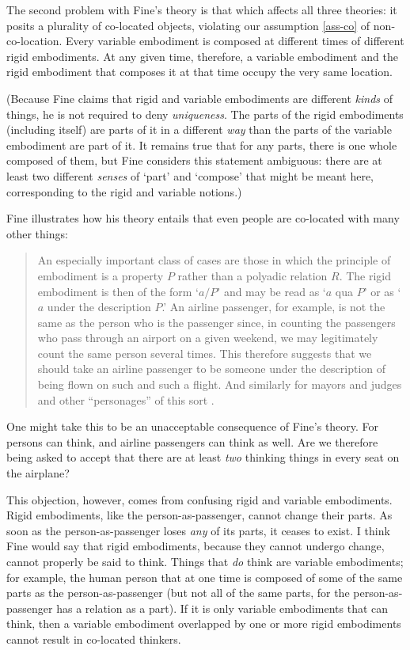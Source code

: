 \documentclass[12pt,twoside]{reedfancy}
\begin{document}
\begin{spacing}{1.25}
The second problem with Fine's theory is that which affects all three
theories: it posits a plurality of co-located objects, violating our
assumption \ref{ass-co} of non-co-location.  Every variable embodiment
is composed at different times of different rigid embodiments.  At any
given time, therefore, a variable embodiment and the rigid embodiment
that composes it at that time occupy the very same location.

(Because Fine claims that rigid and variable embodiments are different
{\em kinds} of things, he is not required to deny {\em uniqueness}.
The parts of the rigid embodiments (including itself) are parts of it
in a different {\em way} than the parts of the variable embodiment are
part of it.  It remains true that for any parts, there is one whole
composed of them, but Fine considers this statement ambiguous: there
are at least two different {\em senses} of `part' and `compose' that
might be meant here, corresponding to the rigid and variable notions.)

Fine illustrates how his theory entails that even people are
co-located with many other things:

\begin{quote}
An especially important class of cases are those in which the
principle of embodiment is a property $P$ rather than a polyadic
relation $R$.  The rigid embodiment is then of the form `$a/P$' and
may be read as `$a$ qua $P$' or as `$a$ under the description $P$.'
An airline passenger, for example, is not the same as the person who
is the passenger since, in counting the passengers who pass through an
airport on a given weekend, we may legitimately count the same person
several times.  This therefore suggests that we should take an airline
passenger to be someone under the description of being flown on such
and such a flight.  And similarly for mayors and judges and other
``personages'' of this sort \citeyearpar[67--68]{fine1999}.
\end{quote}

One might take this to be an unacceptable consequence of Fine's
theory.  For persons can think, and airline passengers can think as
well.  Are we therefore being asked to accept that there are at least
{\em two} thinking things in every seat on the airplane?

This objection, however, comes from confusing rigid and variable
embodiments.  Rigid embodiments, like the person-as-passenger, cannot
change their parts.  As soon as the person-as-passenger loses {\em
  any} of its parts, it ceases to exist.  I think Fine would say that
rigid embodiments, because they cannot undergo change, cannot properly
be said to think.  Things that {\em do} think are variable
embodiments; for example, the human person that at one time is
composed of some of the same parts as the person-as-passenger (but not
all of the same parts, for the person-as-passenger has a relation as a
part).  If it is only variable embodiments that can think, then a
variable embodiment overlapped by one or more rigid embodiments cannot
result in co-located thinkers.


\end{spacing}
\end{document}
